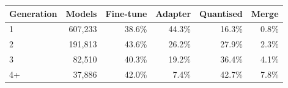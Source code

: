 \begin{tabular}{lrrrrr}
\toprule
Generation & Models & Fine-tune & Adapter & Quantised & Merge \\
\midrule
1 & 607{,}233 & 38.6\% & 44.3\% & 16.3\% & 0.8\% \\
2 & 191{,}813 & 43.6\% & 26.2\% & 27.9\% & 2.3\% \\
3 & 82{,}510 & 40.3\% & 19.2\% & 36.4\% & 4.1\% \\
4+ & 37{,}886 & 42.0\% & 7.4\% & 42.7\% & 7.8\% \\
\bottomrule
\end{tabular}
